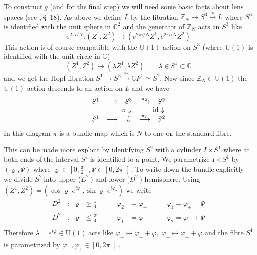 \documentclass[a4paper,12pt,twoside]{article}
\numberwithin{equation}{section}
\let\rho\varrho
\let\phi\varphi
\newcommand{\pU}{\text{U}  }     %
\newcommand{\mC}{\mathbb{C}}
\newcommand{\mZ}{\mathbb{Z}}
\newcommand{\CP}{{\mC P}}
\newcommand{\lauf}{\longrightarrow}
\DeclareMathOperator{\id}{id}
\begin{document}
To construct $g$ (and for the final step) we will need some basic
facts about lens spaces (see \cite{BottTu}, \S~18). As above we define
$L$ by the fibration $\mZ_N \lauf S^3 \overset{\pi}{\lauf} L$ where
$S^3$ is identified with the unit sphere in $\mC^2$ and the generator
of $\mZ_N$ acts on $S^3$ like
\begin{equation}
  \label{eq:ZN}
  e^{2\pi i/N} : (Z^1,Z^2) \mapsto (e^{2\pi i/N} Z^1, e^{2\pi i/N} Z^2)
\end{equation}
This action is of course compatible with the $\pU(1)$ action on $S^3$ (where
$\pU(1)$ is identified with the unit circle in $\mC$)
\begin{equation}
  \label{eq:U1}
  (Z^1,Z^2) \mapsto (\lambda Z^1, \lambda Z^2)
  \qquad
  \lambda \in S^1 \subset \mC
\end{equation}
and we get the Hopf-fibration $S^1 \lauf S^3 \overset{\pi_S}{\lauf}
\CP^1 \simeq S^2$. Now since $\mZ_N \subset \pU(1)$ the $\pU(1)$
action descends to an action on $L$ and we have
\begin{equation}
  \label{eq:BundleMap}
  \begin{matrix}
    S^1 & \lauf & S^3 & \overset{\pi_S}{\lauf} & S^2 \\
        &       & \hbox to 0pt {$\hss\pi$} \downarrow
        && \hbox to 0pt {$\hss\id$} \downarrow \\
    S^1 & \lauf & L & \overset{\pi_L}{\lauf} & S^2 \\
  \end{matrix}
\end{equation}
In this diagram $\pi$ is a bundle map which is $N$ to one on the
standard fibre.

This can be made more explicit by identifying $S^2$ with a cylinder $I
\times S^1$ where at both ends of the interval $S^1$ is identified to
a point. We parametrize $I \times S^1$ by $(\rho,\Psi)$ where $\rho
\in \left[ 0, \tfrac{\pi}{2} \right], \Psi \in \left[ 0, 2\pi
\right[$. To write down the bundle explicitly we divide $S^2$ into
upper ($D^2_+$) and lower ($D^2_-$) hemisphere. Using $(Z^1, Z^2) =
(\cos \rho \; e^{i\phi_1}, \sin \rho \; e^{i\phi_2})$ we write
\begin{equation}
  \label{eq:VS}
  \begin{aligned}
    D^2_+ &:& \rho &\geq \tfrac{\pi}{4}
    \qquad & \phi_2&=\phi_+ \qquad & \phi_1=\phi_+ - \Psi \\
    D^2_- &:& \rho &\leq \tfrac{\pi}{4}
    \qquad & \phi_1&=\phi_- \qquad & \phi_2=\phi_- + \Psi \\
  \end{aligned}
\end{equation}
Therefore $\lambda = e^{i\phi} \in \pU(1)$ acts like $\phi_- \mapsto
\phi_- + \phi, \; \phi_+ \mapsto \phi_+ + \phi$ and the fibre $S^1$ is
parametrized by $\phi_-, \phi_+ \in \left[ 0, 2\pi \right[$.
\end{document}
